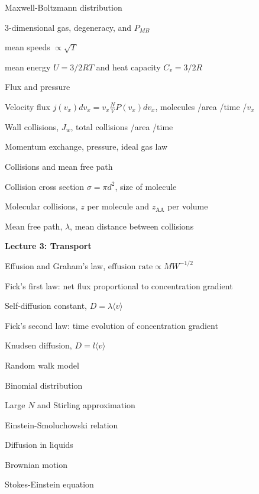 \message{ !name(Outline.tex)}\documentclass[11pt]{article}
\begin{document}
\begin{outline}
\begin{outline}
 \item{Maxwell-Boltzmann distribution}
    \begin{outline}
     \item{3-dimensional gas, degeneracy, and $P_{MB}$}
      \item{mean speeds $\propto \sqrt{T}$ }
      \item{mean energy $U=3/2 RT$ and heat capacity $C_v=3/2 R$}
    \end{outline}
  \item{Flux and pressure}
    \begin{outline}
    \item{Velocity flux $j(v_x) dv_x= v_x \frac{N}{V}P(v_x)dv_x$, molecules /area /time /$v_x$}
    \item{Wall collisions, $J_w$, total collisions /area /time}
    \item{Momentum exchange, pressure, ideal gas law}
    \end{outline}
  \item{Collisions and mean free path}
    \begin{outline}
   \item{Collision cross section $\sigma=\pi d^2$, size of molecule}
    \item {Molecular collisions, $z$ per molecule and $z_{\mathrm{AA}}$ per volume}
    \item{Mean free path, $\lambda$, mean distance between collisions}
    \end{outline}
  \end{outline}
 
\item{{\bf Lecture 3: Transport}}
  \begin{outline}
  \item{Effusion and Graham's law, $\text{effusion rate}\propto MW^{-1/2}$}
  \item{Fick's first law: net flux proportional to concentration gradient}
    \begin{outline}
      \item{Self-diffusion constant, $D=\lambda \langle v \rangle$}
    \end{outline}
  \item{Fick's second law: time evolution of concentration gradient}
  \item Knudsen diffusion, $D=l \langle v \rangle$
  \item{Random walk model}
    \begin{outline}
    \item{Binomial distribution}
    \item{Large $N$ and Stirling approximation}
    \item{Einstein-Smoluchowski relation}
    \end{outline}
  \item{Diffusion in liquids}
    \begin{outline}
    \item{Brownian motion}
    \item{Stokes-Einstein equation}
    \end{outline}
  \end{outline}


\end{outline}
\end{document}
